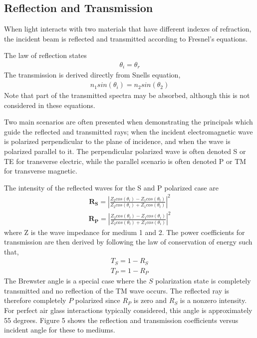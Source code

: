 \subsection{Reflection and Transmission}

When light interacts with two materials that have different indexes of refraction, the incident beam is reflected and transmitted according to Fresnel’s equations.

The law of reflection states
%
\begin{align}
    \theta_i = \theta_r
\end{align}
%
The transmission is derived directly from Snells equation,
%
\begin{align}
    n_1sin(\theta_i) = n_2sin(\theta_2)
\end{align}
%
Note that part of the transmitted spectra may be absorbed, although this is not considered in these equations.

Two main scenarios are often presented when demonstrating the principals which guide the reflected and transmitted rays; when the incident electromagnetic wave is polarized perpendicular to the plane of incidence, and when the wave is polarized parallel to it.  The perpendicular polarized wave is often denoted S or TE for transverse electric, while the parallel scenario is often denoted P or TM for transverse magnetic.


The intensity of the reflected waves for the S and P polarized case are
%
\begin{align}
    \mathbf{R_S} = |\frac{Z_2cos(\theta_i)-Z_1cos(\theta_t)}{Z_2cos(\theta_i)+Z_1cos(\theta_t)}|^2
\end{align}
\begin{align}
    \mathbf{R_P} = |\frac{Z_2cos(\theta_t)-Z_1cos(\theta_i)}{Z_2cos(\theta_t)+Z_1cos(\theta_i)}|^2
\end{align}
%
where Z is the wave impedance for medium 1 and 2.  The power coefficients for transmission are then derived by following the law of conservation of energy such that,
%
\begin{align}
    T_S = 1 - R_S \\
    T_P = 1 - R_P
\end{align}
%
The Brewster angle is a special case where the $S$ polarization state is completely transmitted and no reflection of the TM wave occurs.  The reflected ray is therefore completely $P$ polarized since $R_P$ is zero and $R_S$ is a nonzero intensity.  For perfect air glass interactions typically considered, this angle is approximately 55 degrees.  Figure 5 shows the reflection and transmission coefficients versus incident angle for these to mediums.

